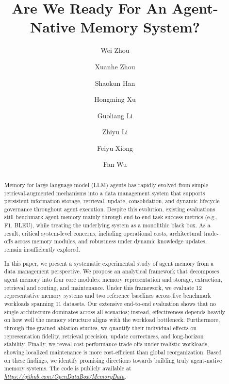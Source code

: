 \documentclass{llmxive}
\title{Are We Ready For An Agent-Native Memory System?}
\author{Wei Zhou \and Xuanhe Zhou \and Shaokun Han \and Hongming Xu \and Guoliang Li \and Zhiyu Li \and Feiyu Xiong \and Fan Wu}
\providecommand{\blue}[1]{#1}
\begin{document}
\maketitle
\begin{abstract}
Memory for large language model (LLM) agents has rapidly evolved from simple retrieval-augmented mechanisms into a data management system that supports persistent information storage, retrieval, update, consolidation, and dynamic lifecycle governance throughout agent execution. Despite this evolution, existing evaluations still benchmark agent memory mainly through end-to-end task success metrics (e.g., F1, BLEU), while treating the underlying system as a monolithic black box. As a result, critical system-level concerns, including operational costs, architectural trade-offs across memory modules, and robustness under dynamic knowledge updates, remain insufficiently explored.


In this paper, we present a systematic experimental study of agent memory from a data management perspective. We propose an analytical framework that decomposes agent memory into four core modules: memory representation and storage, extraction, retrieval and routing, and maintenance. Under this framework, we evaluate 12 representative memory systems and two reference baselines across five benchmark workloads spanning 11 datasets. Our extensive end-to-end evaluation shows that no single architecture dominates across all scenarios; instead, effectiveness depends heavily on how well the memory structure aligns with the workload bottleneck. Furthermore, through fine-grained ablation studies, we quantify their individual effects on representation fidelity, retrieval precision, update correctness, and long-horizon stability. Finally, we reveal cost-performance trade-offs under realistic workloads, showing localized maintenance is more cost-efficient than global reorganization. Based on these findings, we identify promising directions towards building truly agent-native memory systems.
The code is publicly available at \blue{\emph{\url{https://github.com/OpenDataBox/MemoryData}}}.



\end{abstract}
\end{document}
